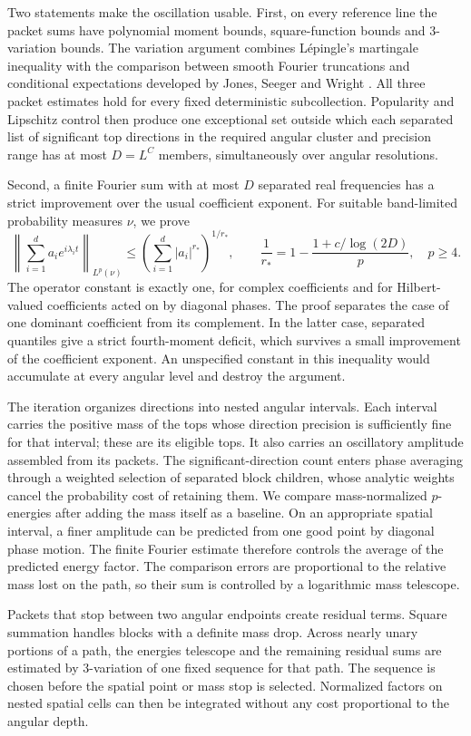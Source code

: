 Two statements make the oscillation usable. First, on every reference
line the packet sums have polynomial moment bounds, square-function
bounds and \(3\)-variation bounds. The variation argument combines
L\'epingle's martingale inequality with the comparison between
smooth Fourier truncations and conditional expectations developed
by Jones, Seeger and Wright \cite{Lepingle1976,JSW2008}. All three
packet estimates hold for every fixed deterministic subcollection. Popularity and Lipschitz control then
produce one exceptional set outside which each separated list of
significant top directions in the required angular cluster and
precision range has at most \(D=L^C\) members, simultaneously over
angular resolutions.

Second, a finite Fourier sum with at most \(D\) separated real
frequencies has a strict improvement over the usual coefficient
exponent. For suitable band-limited probability measures \(\nu\),
we prove
\[
 \left\|\sum_{i=1}^d a_i e^{i\lambda_i t}\right\|_{L^p(\nu)}
 \le \left(\sum_{i=1}^d |a_i|^{r_*}\right)^{1/r_*},
 \qquad
 \frac1{r_*}=1-\frac{1+c/\log(2D)}p,
 \quad p\ge4.
\]
The operator constant is exactly one, for complex coefficients and
for Hilbert-valued coefficients acted on by diagonal phases.
The proof separates the case of one dominant coefficient from its
complement. In the latter case, separated quantiles give a strict
fourth-moment deficit, which survives a small improvement of the
coefficient exponent. An unspecified constant in this inequality
would accumulate at every angular level and destroy the argument.

The iteration organizes directions into nested angular intervals.
Each interval carries the positive mass of the tops whose direction
precision is sufficiently fine for that interval; these are its
eligible tops. It also carries an oscillatory amplitude assembled
from its packets. The significant-direction count enters phase
averaging through a weighted selection of separated block children,
whose analytic weights cancel the probability cost of retaining them.
We compare mass-normalized \(p\)-energies after adding the mass itself
as a baseline. On an appropriate spatial interval, a finer amplitude
can be predicted from one good point by diagonal phase motion. The
finite Fourier estimate therefore controls the average of the
predicted energy factor. The comparison errors are proportional to the
relative mass lost on the path, so their sum is controlled by a
logarithmic mass telescope.

Packets that stop between two angular endpoints create residual
terms. Square summation handles blocks with a definite mass drop.
Across nearly unary portions of a path, the energies telescope and
the remaining residual sums are estimated by \(3\)-variation of
one fixed sequence for that path. The sequence is chosen before the
spatial point or mass stop is selected. Normalized factors on nested
spatial cells can then be integrated without any cost proportional
to the angular depth.

